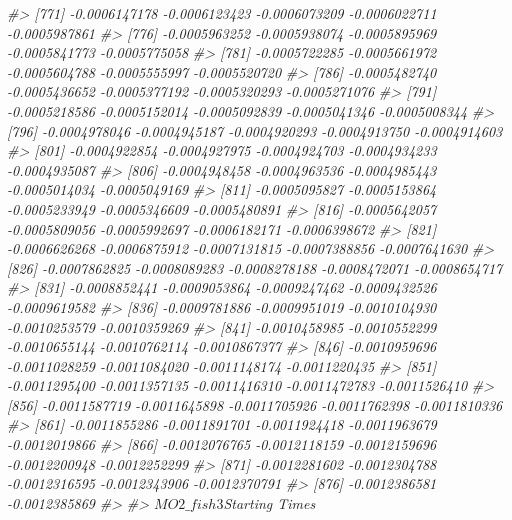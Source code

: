 \documentclass[
]{article}
\newenvironment{Shaded}{\begin{snugshade}}{\end{snugshade}}
\newcommand{\CommentTok}[1]{\textcolor[rgb]{0.56,0.35,0.01}{\textit{#1}}}
\begin{document}
\begin{Shaded}
\begin{Highlighting}[]
\CommentTok{\#\textgreater{} [771] {-}0.0006147178 {-}0.0006123423 {-}0.0006073209 {-}0.0006022711 {-}0.0005987861}
\CommentTok{\#\textgreater{} [776] {-}0.0005963252 {-}0.0005938074 {-}0.0005895969 {-}0.0005841773 {-}0.0005775058}
\CommentTok{\#\textgreater{} [781] {-}0.0005722285 {-}0.0005661972 {-}0.0005604788 {-}0.0005555997 {-}0.0005520720}
\CommentTok{\#\textgreater{} [786] {-}0.0005482740 {-}0.0005436652 {-}0.0005377192 {-}0.0005320293 {-}0.0005271076}
\CommentTok{\#\textgreater{} [791] {-}0.0005218586 {-}0.0005152014 {-}0.0005092839 {-}0.0005041346 {-}0.0005008344}
\CommentTok{\#\textgreater{} [796] {-}0.0004978046 {-}0.0004945187 {-}0.0004920293 {-}0.0004913750 {-}0.0004914603}
\CommentTok{\#\textgreater{} [801] {-}0.0004922854 {-}0.0004927975 {-}0.0004924703 {-}0.0004934233 {-}0.0004935087}
\CommentTok{\#\textgreater{} [806] {-}0.0004948458 {-}0.0004963536 {-}0.0004985443 {-}0.0005014034 {-}0.0005049169}
\CommentTok{\#\textgreater{} [811] {-}0.0005095827 {-}0.0005153864 {-}0.0005233949 {-}0.0005346609 {-}0.0005480891}
\CommentTok{\#\textgreater{} [816] {-}0.0005642057 {-}0.0005809056 {-}0.0005992697 {-}0.0006182171 {-}0.0006398672}
\CommentTok{\#\textgreater{} [821] {-}0.0006626268 {-}0.0006875912 {-}0.0007131815 {-}0.0007388856 {-}0.0007641630}
\CommentTok{\#\textgreater{} [826] {-}0.0007862825 {-}0.0008089283 {-}0.0008278188 {-}0.0008472071 {-}0.0008654717}
\CommentTok{\#\textgreater{} [831] {-}0.0008852441 {-}0.0009053864 {-}0.0009247462 {-}0.0009432526 {-}0.0009619582}
\CommentTok{\#\textgreater{} [836] {-}0.0009781886 {-}0.0009951019 {-}0.0010104930 {-}0.0010253579 {-}0.0010359269}
\CommentTok{\#\textgreater{} [841] {-}0.0010458985 {-}0.0010552299 {-}0.0010655144 {-}0.0010762114 {-}0.0010867377}
\CommentTok{\#\textgreater{} [846] {-}0.0010959696 {-}0.0011028259 {-}0.0011084020 {-}0.0011148174 {-}0.0011220435}
\CommentTok{\#\textgreater{} [851] {-}0.0011295400 {-}0.0011357135 {-}0.0011416310 {-}0.0011472783 {-}0.0011526410}
\CommentTok{\#\textgreater{} [856] {-}0.0011587719 {-}0.0011645898 {-}0.0011705926 {-}0.0011762398 {-}0.0011810336}
\CommentTok{\#\textgreater{} [861] {-}0.0011855286 {-}0.0011891701 {-}0.0011924418 {-}0.0011963679 {-}0.0012019866}
\CommentTok{\#\textgreater{} [866] {-}0.0012076765 {-}0.0012118159 {-}0.0012159696 {-}0.0012200948 {-}0.0012252299}
\CommentTok{\#\textgreater{} [871] {-}0.0012281602 {-}0.0012304788 {-}0.0012316595 {-}0.0012343906 {-}0.0012370791}
\CommentTok{\#\textgreater{} [876] {-}0.0012386581 {-}0.0012385869}
\CommentTok{\#\textgreater{} }
\CommentTok{\#\textgreater{} $MO2\_fish3$\textasciigrave{}Starting Times\textasciigrave{}}

\end{Highlighting}
\end{Shaded}
\end{document}
